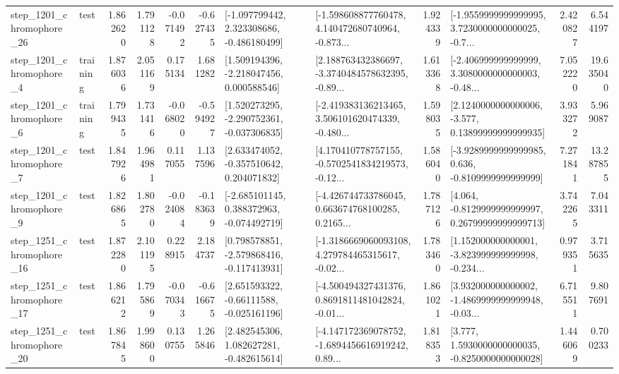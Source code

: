 \begin{tabular}{llrrrrllrlrr}
 step\_1201\_chromophore\_26 &      test &      1.862620 &    1.791128 &     -0.071492 & -0.627435 &   [-1.097799442, 2.323308686, -0.486180499] &  [-1.598608877760478, 4.140472680740964, -0.873... &       1.924339 &  [-1.9559999999999995, 3.7230000000000025, -0.7... &            2.420827 &          6.544197 \\
  step\_1201\_chromophore\_4 &  training &      1.876036 &    2.051169 &      0.175134 &  1.681282 &    [1.509194396, -2.218047456, 0.000588546] &  [2.188763432386697, -3.3740484578632395, -0.89... &       1.613368 &  [-2.406999999999999, 3.3080000000000003, -0.48... &            7.052220 &         19.635040 \\
  step\_1201\_chromophore\_6 &  training &      1.799435 &    1.731416 &     -0.068020 & -0.594927 &   [1.520273295, -2.290752361, -0.037306835] &  [-2.419383136213465, 3.506101620474339, -0.480... &       1.598035 &  [2.1240000000000006, -3.577, 0.13899999999999935] &            3.933272 &          5.969087 \\
  step\_1201\_chromophore\_7 &      test &      1.847926 &    1.964981 &      0.117055 &  1.137596 &    [2.633474052, -0.357510642, 0.204071832] &  [4.170410778757155, -0.5702541834219573, -0.12... &       1.586040 &  [-3.9289999999999985, 0.636, -0.8109999999999999] &            7.271841 &         13.287855 \\
  step\_1201\_chromophore\_9 &      test &      1.826865 &    1.802780 &     -0.024084 & -0.183639 &   [-2.685101145, 0.388372963, -0.074492719] &  [-4.426744733786045, 0.663674768100285, 0.2165... &       1.787126 &  [4.064, -0.8129999999999997, 0.26799999999999713] &            3.742265 &          7.043311 \\
 step\_1251\_chromophore\_16 &      test &      1.872280 &    2.101195 &      0.228915 &  2.184737 &   [0.798578851, -2.579868416, -0.117413931] &  [-1.3186669060093108, 4.279784465315617, -0.02... &       1.783460 &  [1.152000000000001, -3.823999999999998, -0.234... &            0.979351 &          3.715635 \\
 step\_1251\_chromophore\_17 &      test &      1.866212 &    1.795869 &     -0.070343 & -0.616675 &    [2.651593322, -0.66111588, -0.025161196] &  [-4.500494327431376, 0.8691811481042824, -0.01... &       1.861021 &  [3.932000000000002, -1.4869999999999948, -0.03... &            6.715511 &          9.807691 \\
 step\_1251\_chromophore\_20 &      test &      1.867845 &    1.998600 &      0.130755 &  1.265846 &    [2.482545306, 1.082627281, -0.482615614] &  [-4.147172369078752, -1.6894456616919242, 0.89... &       1.818353 &   [3.777, 1.5930000000000035, -0.8250000000000028] &            1.446069 &          0.700233 \\

\end{tabular}
